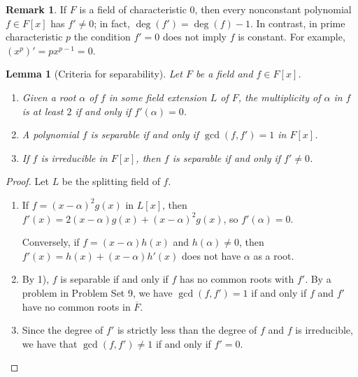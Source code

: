 \documentclass[12pt]{report}
\newtheorem{lemma}[theorem]{Lemma}
\numberwithin{equation}{section}
\numberwithin{theorem}{chapter}
\theoremstyle{definition}
\newtheorem*{basic properties}{Basic Properties}
\newtheorem*{Important Remark}{Important Remark}
\newtheorem{remark}[theorem]{Remark}
\begin{document}
\begin{remark}
	If $F$ is a field of characteristic $0$, then every nonconstant polynomial $f \in F[x]$ has $f' \neq 0$; in fact, $\deg(f') = \deg(f) -1$. In contrast, in prime characteristic $p$ the condition $f' = 0$ does not imply $f$ is constant. For example, $(x^p)' = px^{p-1} = 0$.
\end{remark}



\begin{lemma}[Criteria for separability]\label{criteria separability}
Let $F$ be a field and $f \in F[x]$.
\begin{enumerate}[label=\alph*),leftmargin=15pt]
\item Given a root $\alpha$ of $f$ in some field extension $L$ of $F$, the multiplicity of $\alpha$ in $f$ is at least $2$ if and only if $f'(\alpha) = 0$.
\item A polynomial $f$ is separable if and only if $\gcd(f, f') = 1$ in $F[x]$. 
\item If $f$ is irreducible in $F[x]$, then $f$ is separable if and only if $f' \neq 0$.
\end{enumerate}
\end{lemma}

\begin{proof} 
Let $L$ be the splitting field of $f$. 

\begin{enumerate}[label=\alph*),leftmargin=15pt]
\item If $f = (x-\alpha)^2g(x)$ in $L[x]$, then $f'(x) = 2(x - \alpha) g(x) + (x-\alpha)^2 g(x)$, so $f'(\alpha) = 0$. 

Conversely, if $f = (x-\alpha)h(x)$ and $h(\alpha) \neq 0$, then $f'(x) = h(x) + (x-\alpha)h'(x)$
  does not have $\alpha$ as a root.
  
\item By 1), $f$ is separable if and only if $f$ has no common roots with $f'$. By a problem in Problem Set 9, we have $\gcd(f, f') = 1$ if and only if $f$ and $f'$ have no common roots in $\overline{F}$. 

\item Since the degree of $f'$ is strictly less than the degree of $f$ and $f$ is irreducible, we have that $\gcd(f,f') \neq 1$ if and only if $f' = 0$.\qedhere
\end{enumerate}
\end{proof}
\end{document}
